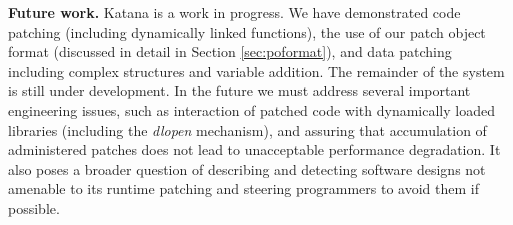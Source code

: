 {\bf Future work.} Katana is a work in progress.
We have demonstrated code patching (including dynamically linked
functions), the use of our patch object format (discussed in detail in
Section \ref{sec:poformat}), and data patching including complex
structures and variable addition. The remainder of the system is still
under development. In the future we
must address several 
important engineering issues, such as interaction of patched code with
dynamically loaded libraries (including the {\em dlopen} mechanism),
and assuring that accumulation of administered patches does not lead to
unacceptable performance degradation. It also poses a broader question
of describing and detecting software designs not amenable to its runtime
patching and steering programmers to avoid them if possible. 
